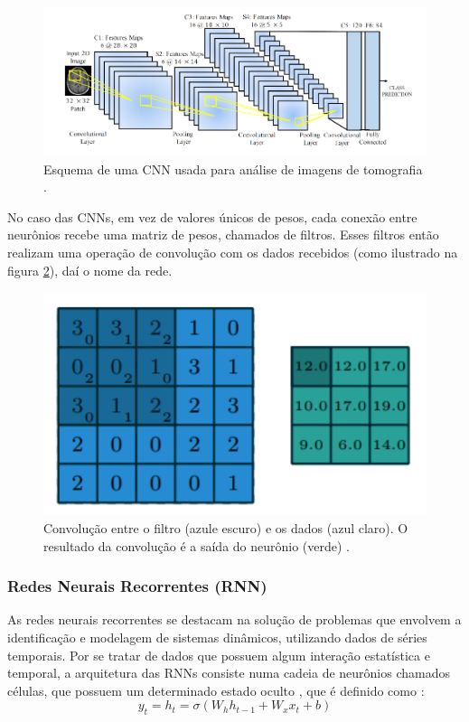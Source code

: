 \begin{figure}[hbt!]
    \centering
    \includegraphics[width=0.8\linewidth]{Imagens/chap02/cnn_scheme.png}
    \caption{Esquema de uma CNN usada para análise de imagens de tomografia \cite{anwar2018medical}.}
    \label{fig:cnn_scheme}
\end{figure}

No caso das CNNs, em vez de valores únicos de pesos, cada conexão entre neurônios recebe uma matriz de pesos, chamados de filtros. Esses filtros então realizam uma operação de convolução com os dados recebidos (como ilustrado na figura \ref{fig:conv_scheme}), daí o nome da rede.

\begin{figure}[hbt!]
    \centering
    \includegraphics[width=0.5\linewidth]{Imagens/chap02/conv_scheme.png}
    \caption{Convolução entre o filtro (azule escuro) e os dados (azul claro). O resultado da convolução é a saída do neurônio (verde) \cite{odena2016deconvolution}.}
    \label{fig:conv_scheme}
\end{figure}

\subsubsection{Redes Neurais Recorrentes (RNN)}
As redes neurais recorrentes se destacam na solução de problemas que envolvem a identificação e modelagem de sistemas dinâmicos, utilizando dados de séries temporais. Por se tratar de dados que possuem algum interação estatística e temporal, a arquitetura das RNNs consiste numa cadeia de neurônios chamados células, que possuem um determinado estado oculto , que é definido como \cite{yu2019review}:
\begin{equation}
    y_t = h_t = \sigma(W_h h_{t-1}+W_xx_t+b)
\end{equation}

